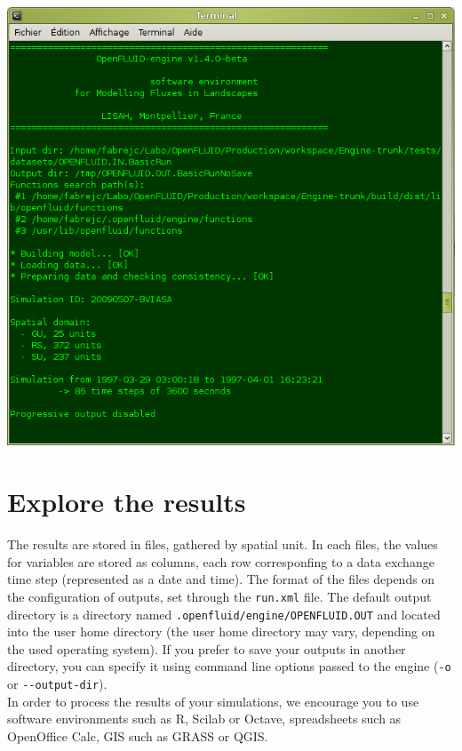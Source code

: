 \begin{htmlonly}
\begin{center}
\includegraphics[scale=1]{common/graphics/oferun.png}
\end{center}
\end{htmlonly}

\section{Explore the results}

The results are stored in files, gathered by spatial unit. In each files, the values for variables are stored as columns, each row corresponfing to a data exchange time step (represented as a date and time).
The format of the files depends on the configuration of outputs, set through the \texttt{run.xml} file.
The default output directory is a directory named \texttt{.openfluid/engine/OPENFLUID.OUT} and located into the user home directory (the user home directory may vary, depending on the used operating system).
If you prefer to save your outputs in another directory, you can specify it using command line options passed to the engine (\texttt{-o} or \verb?--?\texttt{output-dir}).\\

\noindent In order to process the results of your simulations, we encourage you to use software environments such as R, Scilab or Octave, spreadsheets such as OpenOffice Calc, GIS such as GRASS or QGIS.   
